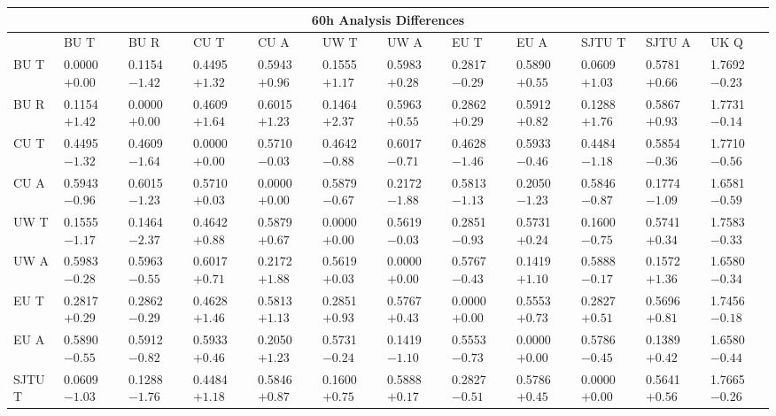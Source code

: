 \begin{landscape}
\begin{table}
\small
\centering
\renewcommand{\arraystretch}{1.5}
\begin{tabularx}{1\linewidth}{@{\extracolsep{\fill}}lXXXXXXXXXXX}
  \toprule
  	\multicolumn{12}{c}{{\normalsize 60h Analysis Differences}} \\
  \midrule
  	       & BU T & BU R & CU T & CU A & UW T & UW A & EU T & EU A & SJTU T & SJTU A & UK Q \\
  \midrule
	BU T   & 0.0000 $+0.00$ & 0.1154 $-1.42$ & 0.4495 $+1.32$ & 0.5943 $+0.96$ & 0.1555 $+1.17$ & 0.5983 $+0.28$ & 0.2817 $-0.29$ & 0.5890 $+0.55$ & 0.0609 $+1.03$ & 0.5781 $+0.66$ & 1.7692 $-0.23$  \\
	BU R   & 0.1154 $+1.42$ & 0.0000 $+0.00$ & 0.4609 $+1.64$ & 0.6015 $+1.23$ & 0.1464 $+2.37$ & 0.5963 $+0.55$ & 0.2862 $+0.29$ & 0.5912 $+0.82$ & 0.1288 $+1.76$ & 0.5867 $+0.93$ & 1.7731 $-0.14$  \\
	CU T   & 0.4495 $-1.32$ & 0.4609 $-1.64$ & 0.0000 $+0.00$ & 0.5710 $-0.03$ & 0.4642 $-0.88$ & 0.6017 $-0.71$ & 0.4628 $-1.46$ & 0.5933 $-0.46$ & 0.4484 $-1.18$ & 0.5854 $-0.36$ & 1.7710 $-0.56$  \\
	CU A   & 0.5943 $-0.96$ & 0.6015 $-1.23$ & 0.5710 $+0.03$ & 0.0000 $+0.00$ & 0.5879 $-0.67$ & 0.2172 $-1.88$ & 0.5813 $-1.13$ & 0.2050 $-1.23$ & 0.5846 $-0.87$ & 0.1774 $-1.09$ & 1.6581 $-0.59$  \\
	UW T   & 0.1555 $-1.17$ & 0.1464 $-2.37$ & 0.4642 $+0.88$ & 0.5879 $+0.67$ & 0.0000 $+0.00$ & 0.5619 $-0.03$ & 0.2851 $-0.93$ & 0.5731 $+0.24$ & 0.1600 $-0.75$ & 0.5741 $+0.34$ & 1.7583 $-0.33$  \\
	UW A   & 0.5983 $-0.28$ & 0.5963 $-0.55$ & 0.6017 $+0.71$ & 0.2172 $+1.88$ & 0.5619 $+0.03$ & 0.0000 $+0.00$ & 0.5767 $-0.43$ & 0.1419 $+1.10$ & 0.5888 $-0.17$ & 0.1572 $+1.36$ & 1.6580 $-0.34$  \\
	EU T   & 0.2817 $+0.29$ & 0.2862 $-0.29$ & 0.4628 $+1.46$ & 0.5813 $+1.13$ & 0.2851 $+0.93$ & 0.5767 $+0.43$ & 0.0000 $+0.00$ & 0.5553 $+0.73$ & 0.2827 $+0.51$ & 0.5696 $+0.81$ & 1.7456 $-0.18$  \\
	EU A   & 0.5890 $-0.55$ & 0.5912 $-0.82$ & 0.5933 $+0.46$ & 0.2050 $+1.23$ & 0.5731 $-0.24$ & 0.1419 $-1.10$ & 0.5553 $-0.73$ & 0.0000 $+0.00$ & 0.5786 $-0.45$ & 0.1389 $+0.42$ & 1.6580 $-0.44$  \\
	SJTU T & 0.0609 $-1.03$ & 0.1288 $-1.76$ & 0.4484 $+1.18$ & 0.5846 $+0.87$ & 0.1600 $+0.75$ & 0.5888 $+0.17$ & 0.2827 $-0.51$ & 0.5786 $+0.45$ & 0.0000 $+0.00$ & 0.5641 $+0.56$ & 1.7665 $-0.26$  \\

\end{tabularx}
\end{table}
\end{landscape}
